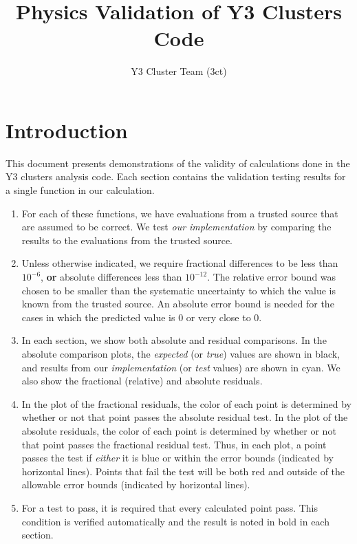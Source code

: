 \documentclass[
  twocolumn,
  landscape]{report}
\title{Physics Validation of Y3 Clusters Code}
\author{Y3 Cluster Team (3ct)}
\date{}
\providecommand{\tightlist}{%
  \setlength{\itemsep}{0pt}\setlength{\parskip}{0pt}}\usepackage{longtable,booktabs,array}
\renewcommand*\contentsname{Table of contents}
\newcommand\contentsname{Table of contents}
\begin{document}
\maketitle
\ifdefined\Shaded\renewenvironment{Shaded}{\begin{tcolorbox}[borderline west={3pt}{0pt}{shadecolor}, enhanced, sharp corners, interior hidden, frame hidden, breakable, boxrule=0pt]}{\end{tcolorbox}}\fi

\renewcommand*\contentsname{Table of contents}
{
\hypersetup{linkcolor=}
\setcounter{tocdepth}{0}
\tableofcontents
}
\hypertarget{introduction}{%
\chapter{Introduction}\label{introduction}}

This document presents demonstrations of the validity of calculations
done in the Y3 clusters analysis code. Each section contains the
validation testing results for a single function in our calculation.

\begin{enumerate}
\def\labelenumi{\alph{enumi}.}
\tightlist
\item
  For each of these functions, we have evaluations from a trusted source
  that are assumed to be correct. We test \emph{our implementation} by
  comparing the results to the evaluations from the trusted source.
\item
  Unless otherwise indicated, we require fractional differences to be
  less than \(\ensuremath{10^{-6}}\), \textbf{or} absolute differences
  less than \(\ensuremath{10^{-12}}\). The relative error bound was
  chosen to be smaller than the systematic uncertainty to which the
  value is known from the trusted source. An absolute error bound is
  needed for the cases in which the predicted value is 0 or very close
  to 0.
\item
  In each section, we show both absolute and residual comparisons. In
  the absolute comparison plots, the \emph{expected} (or \emph{true})
  values are shown in black, and results from our \emph{implementation}
  (or \emph{test} values) are shown in cyan. We also show the fractional
  (relative) and absolute residuals.
\item
  In the plot of the fractional residuals, the color of each point is
  determined by whether or not that point passes the absolute residual
  test. In the plot of the absolute residuals, the color of each point
  is determined by whether or not that point passes the fractional
  residual test. Thus, in each plot, a point passes the test if
  \emph{either} it is blue or within the error bounds (indicated by
  horizontal lines). Points that fail the test will be both red and
  outside of the allowable error bounds (indicated by horizontal lines).
\item
  For a test to pass, it is required that every calculated point pass.
  This condition is verified automatically and the result is noted in
  bold in each section.
\end{enumerate}
\end{document}
